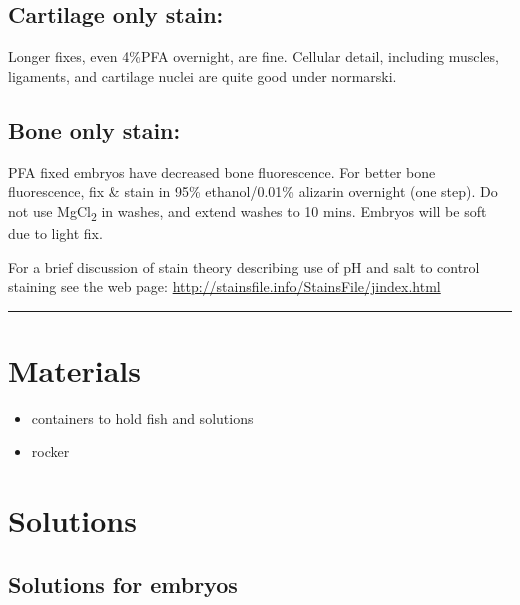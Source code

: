 \documentclass[
  letterpaper,
  DIV=11,
  numbers=noendperiod]{scrreprt}
\providecommand{\tightlist}{%
  \setlength{\itemsep}{0pt}\setlength{\parskip}{0pt}}\usepackage{longtable,booktabs,array}
\begin{document}
\hypertarget{cartilage-only-stain}{%
\subsection{Cartilage only stain:}\label{cartilage-only-stain}}

Longer fixes, even 4\%PFA overnight, are fine. Cellular detail,
including muscles, ligaments, and cartilage nuclei are quite good under
normarski.

\hypertarget{bone-only-stain}{%
\subsection{Bone only stain:}\label{bone-only-stain}}

PFA fixed embryos have decreased bone fluorescence. For better bone
fluorescence, fix \& stain in 95\% ethanol/0.01\% alizarin overnight
(one step). Do not use MgCl\textsubscript{2} in washes, and extend
washes to 10 mins. Embryos will be soft due to light fix.

For a brief discussion of stain theory describing use of pH and salt to
control staining see the web page:
\url{http://stainsfile.info/StainsFile/jindex.html}

\begin{center}\rule{0.5\linewidth}{0.5pt}\end{center}

\hypertarget{materials-68}{%
\section{Materials}\label{materials-68}}

\begin{itemize}
\tightlist
\item
  containers to hold fish and solutions
\item
  rocker
\end{itemize}

\hypertarget{solutions-60}{%
\section{Solutions}\label{solutions-60}}

\hypertarget{solutions-for-embryos}{%
\subsection{Solutions for embryos}\label{solutions-for-embryos}}
\end{document}
